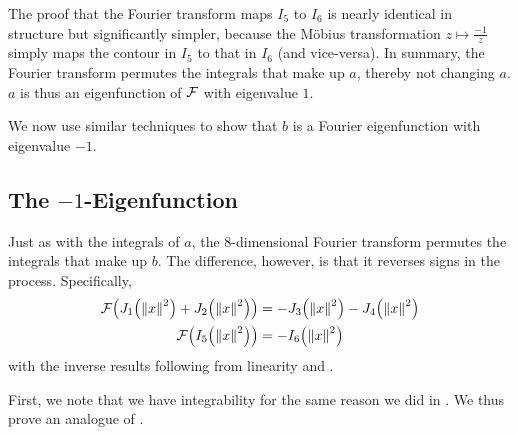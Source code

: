 The proof that the Fourier transform maps $I_5$ to $I_6$ is nearly identical in structure but significantly simpler, because the Möbius transformation $z \mapsto \frac{-1}{z}$ simply maps the contour in $I_5$ to that in $I_6$ (and vice-versa). In summary, the Fourier transform permutes the integrals that make up $a$, thereby not changing $a$. $a$ is thus an eigenfunction of $\mathcal{F}$ with eigenvalue $1$.


We now use similar techniques to show that $b$ is a Fourier eigenfunction with eigenvalue $-1$. %

\subsection{The $-1$-Eigenfunction}

Just as with the integrals of $a$, the $8$-dimensional Fourier transform permutes the integrals that make up $b$. The difference, however, is that it reverses signs in the process. Specifically,
\begin{align}
    \F\of{J_1\of{\norm{x}^2} + J_2\of{\norm{x}^2}} &= -J_3\of{\norm{x}^2} - J_4\of{\norm{x}^2} \label{Ch4:Eq:b_is_eig_perm_12_34} \\
    \F\of{I_5\of{\norm{x}^2}} &= -I_6\of{\norm{x}^2} \label{Ch4:Eq:b_is_eig_perm_5_6}
\end{align}
with the inverse results following from linearity and .

First, we note that we have integrability for the same reason we did in . We thus prove an analogue of .

